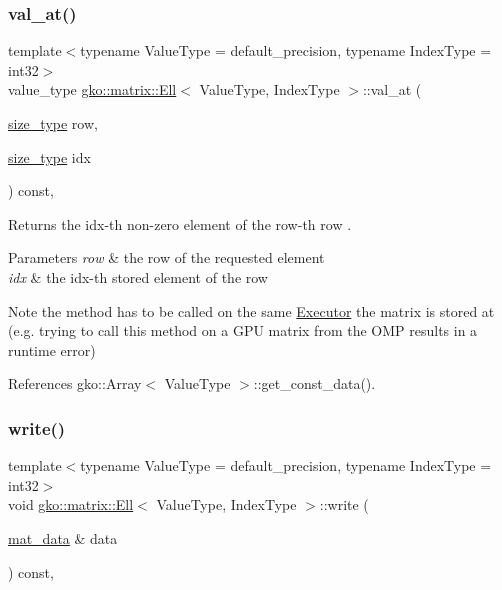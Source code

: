 \subsubsection{\texorpdfstring{val\+\_\+at()}{val\_at()}\hspace{0.1cm}{\footnotesize\ttfamily [2/2]}}
{\footnotesize\ttfamily template$<$typename Value\+Type = default\+\_\+precision, typename Index\+Type = int32$>$ \\
value\+\_\+type \hyperlink{classgko_1_1matrix_1_1Ell}{gko\+::matrix\+::\+Ell}$<$ Value\+Type, Index\+Type $>$\+::val\+\_\+at (\begin{DoxyParamCaption}\item[{\hyperlink{namespacegko_a6e5c95df0ae4e47aab2f604a22d98ee7}{size\+\_\+type}}]{row,  }\item[{\hyperlink{namespacegko_a6e5c95df0ae4e47aab2f604a22d98ee7}{size\+\_\+type}}]{idx }\end{DoxyParamCaption}) const\hspace{0.3cm}{\ttfamily [inline]}, {\ttfamily [noexcept]}}



Returns the {\ttfamily idx}-\/th non-\/zero element of the {\ttfamily row}-\/th row . 


\begin{DoxyParams}{Parameters}
{\em row} & the row of the requested element \\
\hline
{\em idx} & the idx-\/th stored element of the row\\
\hline
\end{DoxyParams}
\begin{DoxyNote}{Note}
the method has to be called on the same \hyperlink{classgko_1_1Executor}{Executor} the matrix is stored at (e.\+g. trying to call this method on a G\+PU matrix from the O\+MP results in a runtime error) 
\end{DoxyNote}


References gko\+::\+Array$<$ Value\+Type $>$\+::get\+\_\+const\+\_\+data().

\mbox{\label{classgko_1_1matrix_1_1Ell_afa9148a16a9255003055d8e9156ee941}} 
\subsubsection{\texorpdfstring{write()}{write()}}
{\footnotesize\ttfamily template$<$typename Value\+Type = default\+\_\+precision, typename Index\+Type = int32$>$ \\
void \hyperlink{classgko_1_1matrix_1_1Ell}{gko\+::matrix\+::\+Ell}$<$ Value\+Type, Index\+Type $>$\+::write (\begin{DoxyParamCaption}\item[{\hyperlink{structgko_1_1matrix__data}{mat\+\_\+data} \&}]{data }\end{DoxyParamCaption}) const\hspace{0.3cm}{\ttfamily [override]}, {\ttfamily [virtual]}}



